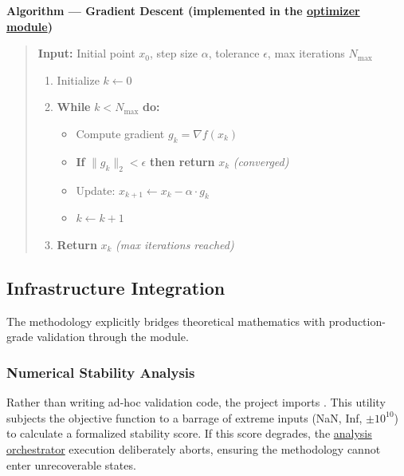 \documentclass[
]{article}
\providecommand{\tightlist}{%
  \setlength{\itemsep}{0pt}\setlength{\parskip}{0pt}}
\begin{document}
\textbf{Algorithm --- Gradient Descent (implemented in the
\href{https://github.com/docxology/template/blob/main/projects/template_code_project/src/optimizer.py\#L87-L173}{optimizer
module})}

\begin{quote}
\textbf{Input:} Initial point \(x_0\), step size \(\alpha\), tolerance
\(\epsilon\), max iterations \(N_{\max}\)

\begin{enumerate}
\def\labelenumi{\arabic{enumi}.}
\tightlist
\item
  Initialize \(k \leftarrow 0\)
\item
  \textbf{While} \(k < N_{\max}\) \textbf{do:}

  \begin{itemize}
  \tightlist
  \item
    Compute gradient \(g_k = \nabla f(x_k)\)
  \item
    \textbf{If} \(\|g_k\|_2 < \epsilon\) \textbf{then return} \(x_k\)
    \emph{(converged)}
  \item
    Update: \(x_{k+1} \leftarrow x_k - \alpha \cdot g_k\)
  \item
    \(k \leftarrow k + 1\)
  \end{itemize}
\item
  \textbf{Return} \(x_k\) \emph{(max iterations reached)}
\end{enumerate}
\end{quote}

\subsection{Infrastructure
Integration}\label{infrastructure-integration-1}

The methodology explicitly bridges theoretical mathematics with
production-grade validation through the
 module.

\subsubsection{Numerical Stability
Analysis}\label{numerical-stability-analysis}

Rather than writing ad-hoc validation code, the project imports
.
This utility subjects the objective function to a barrage of extreme
inputs (NaN, Inf, \(\pm 10^{10}\)) to calculate a formalized stability
score. If this score degrades, the
\href{https://github.com/docxology/template/blob/main/scripts/02_run_analysis.py}{analysis
orchestrator} execution deliberately aborts, ensuring the methodology
cannot enter unrecoverable states.
\end{document}
